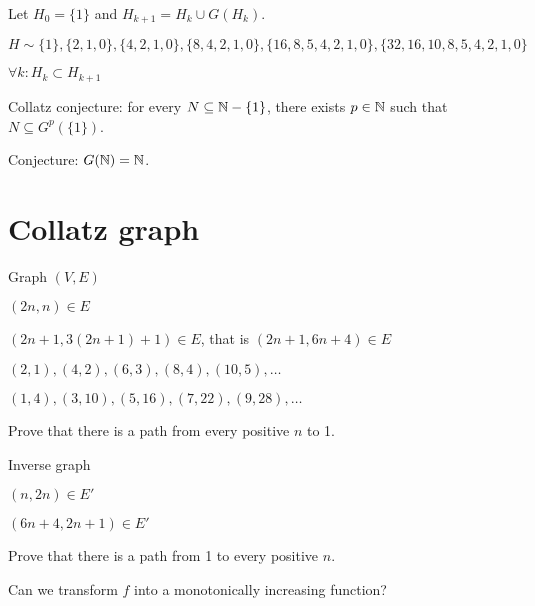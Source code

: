 Let \(H_0 = \{1\}\) and \(H_{k+1} = H_k \cup G(H_k)\).

\(H \sim \{1\}, \{2,1,0\}, \{4,2,1,0\}, \{8,4,2,1,0\}, \{16,8,5,4,2,1,0\}, \{32,16,10,8,5,4,2,1,0\}\)

\(\forall k : H_k \subset H_{k+1}\)

Collatz conjecture: for every \(N \subseteq \mathbb{N} - \{1\}\), there exists \(p \in \mathbb{N}\) such that \(N \subseteq G^p(\{1\})\).

Conjecture: \(G(\mathbb{N}) = \mathbb{N}\).

\section{Collatz graph}

Graph \((V,E)\)

\((2n,n) \in E\)

\((2n+1,3(2n+1)+1) \in E\), that is
\((2n+1,6n+4) \in E\)

\((2,1),(4,2),(6,3),(8,4),(10,5),\ldots\)

\((1,4),(3,10),(5,16),(7,22),(9,28),\ldots\)

Prove that there is a path from every positive \(n\) to 1.

Inverse graph

\((n,2n) \in E'\)

\((6n+4,2n+1) \in E'\)

Prove that there is a path from 1 to every positive \(n\).

Can we transform \(f\) into a monotonically increasing function?
